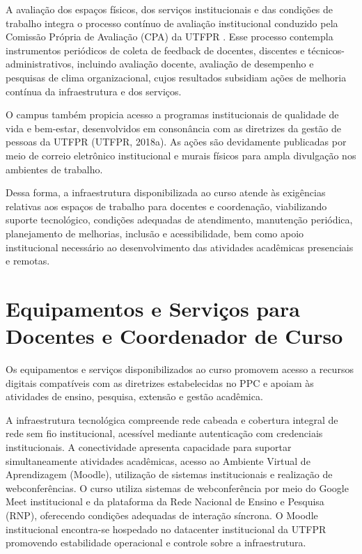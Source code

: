 A avaliação dos espaços físicos, dos serviços institucionais e das condições de trabalho integra o processo contínuo de avaliação institucional conduzido pela Comissão Própria de Avaliação (CPA) da UTFPR \cite{UTFPR_CPA_2004, UTFPR_CPA_2009}. Esse processo contempla instrumentos periódicos de coleta de feedback de docentes, discentes e técnicos-administrativos, incluindo avaliação docente, avaliação de desempenho e pesquisas de clima organizacional, cujos resultados subsidiam ações de melhoria contínua da infraestrutura e dos serviços.

O campus também propicia acesso a programas institucionais de qualidade de vida e bem-estar, desenvolvidos em consonância com as diretrizes da gestão de pessoas da UTFPR (UTFPR, 2018a). As ações são devidamente publicadas por meio de correio eletrônico institucional e murais físicos para ampla divulgação nos ambientes de trabalho.

Dessa forma, a infraestrutura disponibilizada ao curso atende às exigências relativas aos espaços de trabalho para docentes e coordenação, viabilizando suporte tecnológico, condições adequadas de atendimento, manutenção periódica, planejamento de melhorias, inclusão e acessibilidade, bem como apoio institucional necessário ao desenvolvimento das atividades acadêmicas presenciais e remotas.

\section{Equipamentos e Serviços para Docentes e Coordenador de Curso}

Os equipamentos e serviços disponibilizados ao curso promovem acesso a recursos digitais compatíveis com as diretrizes estabelecidas no PPC e apoiam às atividades de ensino, pesquisa, extensão e gestão acadêmica.

A infraestrutura tecnológica compreende rede cabeada e cobertura integral de rede sem fio institucional, acessível mediante autenticação com credenciais institucionais. A conectividade apresenta capacidade para suportar simultaneamente atividades acadêmicas, acesso ao Ambiente Virtual de Aprendizagem (Moodle), utilização de sistemas institucionais e realização de webconferências. O curso utiliza sistemas de webconferência por meio do Google Meet institucional e da plataforma da Rede Nacional de Ensino e Pesquisa (RNP), oferecendo condições adequadas de interação síncrona. O Moodle institucional encontra-se hospedado no datacenter institucional da UTFPR promovendo estabilidade operacional e controle sobre a infraestrutura.

